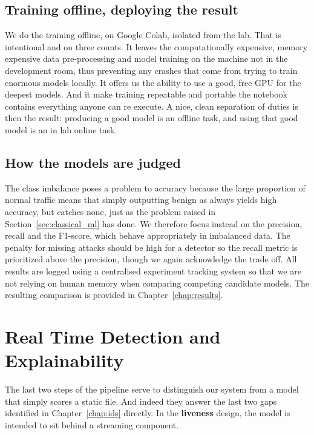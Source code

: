 \subsection{Training offline, deploying the result}
\label{sec:conception_offline}

We do the training offline, on Google Colab, isolated from the lab. That is intentional and on three counts. It leaves the computationally expensive, memory expensive data pre-processing and model training on the machine not in the development room, thus preventing any crashes that come from trying to train enormous models locally. 
It offers us the ability to use a good, free GPU for the deepest models. 
And it make training repeatable and portable the notebook contains everything anyone can re execute. A nice, clean separation of duties is then the result: producing a good model is an offline task, and using that good model is an in lab online task.

\subsection{How the models are judged}
\label{sec:conception_metrics}

The class imbalance poses a problem to accuracy because the large proportion of normal traffic means that simply outputting benign as always yields high accuracy, but catches none, just as the problem raised in Section~\ref{sec:classical_ml} has done. We therefore focus instead on the precision, recall and the F1-score, which behave appropriately in imbalanced data. The penalty for missing attacks should be high for a detector so the recall metric is prioritized above the precision, though we again acknowledge the trade off. 
All results are logged using a centralised experiment tracking system so that we are not relying on human memory when comparing competing candidate models. 
The resulting comparison is provided in Chapter~\ref{chap:results}.

\section{Real Time Detection and Explainability}
\label{sec:conception_realtime}

The last two steps of the pipeline serve to distinguish our system from a model that simply scores a static file. And indeed they answer the last two gaps identified in Chapter~\ref{chap:ids} directly. In the \textbf{liveness} design, the model is intended to sit behind a streaming component.

